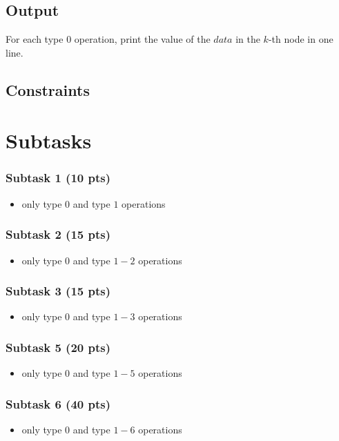 \subsection{Output}\label{output}
For each type $0$ operation, print the value of the $data$ in the $k$-th node in one line.
\subsection{Constraints}\label{constraint}

\section*{Subtasks}
\subsubsection{Subtask 1 (10 pts)}\label{subtask-1}
\begin{itemize}
\item only type $0$ and type $1$ operations
\end{itemize}

\subsubsection{Subtask 2 (15 pts)}\label{subtask-1}
\begin{itemize}
\item only type $0$ and type $1-2$ operations
\end{itemize}

\subsubsection{Subtask 3 (15 pts)}\label{subtask-1}
\begin{itemize}
\item only type $0$ and type $1-3$ operations
\end{itemize}

\subsubsection{Subtask 5 (20 pts)}\label{subtask-1}
\begin{itemize}
\item only type $0$ and type $1-5$ operations
\end{itemize}

\subsubsection{Subtask 6 (40 pts)}\label{subtask-1}
\begin{itemize}
\item only type $0$ and type $1-6$ operations
\end{itemize}

